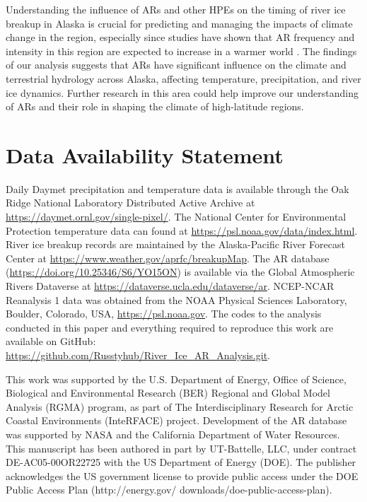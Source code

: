 \documentclass[12pts,draft]{AR_analysis_}
\begin{document}
Understanding the influence of ARs and other HPEs on the
timing of river ice breakup in Alaska is 
crucial for predicting and managing the impacts of climate change in the region, 
especially since studies have shown that AR frequency and intensity in this region are 
expected to increase in a warmer world \cite{Espinoza2018, Massoud2019}. The findings 
of our analysis suggests that ARs have significant influence on the climate and
terrestrial hydrology across Alaska, 
affecting temperature, precipitation, and river ice dynamics. Further research in this 
area could help improve our understanding of ARs and their role in shaping the climate 
of high-latitude regions.


%
%

\section*{Data Availability Statement}
Daily Daymet precipitation and temperature data is available through the Oak Ridge 
National Laboratory Distributed Active Archive at \url{https://daymet.ornl.gov/single-pixel/}.
The National Center for Environmental Protection temperature data can found at
\url{https://psl.noaa.gov/data/index.html}.
River ice breakup records are maintained by the Alaska-Pacific River Forecast Center 
at \url{https://www.weather.gov/aprfc/breakupMap}. The AR database 
(\url{https://doi.org/10.25346/S6/YO15ON}) is available via the Global 
Atmospheric Rivers Dataverse at \url{https://dataverse.ucla.edu/dataverse/ar}.
NCEP-NCAR Reanalysis 1 data was obtained from the 
NOAA Physical Sciences Laboratory, Boulder, Colorado, USA, \url{https://psl.noaa.gov}.
The codes to the analysis conducted in this paper and everything required 
to reproduce this work are available 
on GitHub: \url{https://github.com/Russtyhub/River_Ice_AR_Analysis.git}.


\acknowledgments
This work was supported by the U.S. Department of
Energy, Office of Science, Biological and Environmental Research (BER)
Regional and Global Model Analysis (RGMA) program, as part of The 
Interdisciplinary Research for Arctic Coastal Environments (InteRFACE) 
project. Development of the AR database was supported by NASA and the 
California Department of Water Resources. 
This manuscript has been authored in part by UT-Battelle, LLC, under contract
DE-AC05-00OR22725 with the US Department of Energy (DOE).
The publisher acknowledges the US government license to provide
public access under the DOE Public Access Plan (http://energy.gov/
downloads/doe-public-access-plan).
\end{document}
